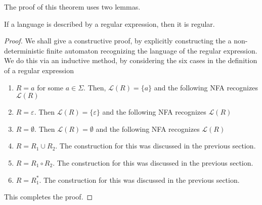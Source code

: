 The proof of this theorem uses two lemmas.

\begin{lemma}
    If a language is described by a regular expression, then it is regular.
\end{lemma}
\begin{proof}
    We shall give a constructive proof, by explicitly constructing the a non-deterministic finite automaton recognizing the language of the regular expression. We do this via an inductive method, by considering the six cases in the definition of a regular expression 
    \begin{enumerate}
        \item $R = a$ for some $a\in\Sigma$. Then, $\mathcal{L}(R) = \{a\}$ and the following NFA recognizes $\mathcal{L}(R)$
        \begin{center}
        \end{center}
        \item $R = \varepsilon$. Then $\mathcal{L}(R) = \{\varepsilon\}$ and the following NFA recognizes $\mathcal{L}(R)$
        \begin{center}
        \end{center}
        \item $R = \emptyset$. Then $\mathcal{L}(R) = \emptyset$ and the following NFA recognizes $\mathcal{L}(R)$
        \begin{center}
        \end{center}
        \item $R = R_1\cup R_2$. The construction for this was discussed in the previous section.
        \item $R = R_1\circ R_2$. The construction for this was discussed in the previous section.
        \item $R = R_1^*$. The construction for this was discussed in the previous section.
    \end{enumerate}

    This completes the proof.
\end{proof}

